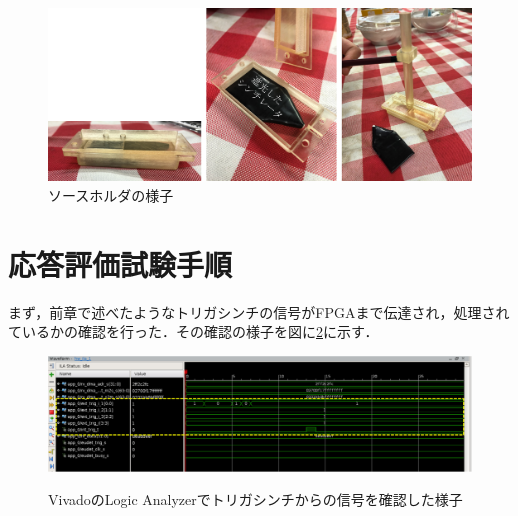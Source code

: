 \begin{figure}[h]
  \centering
  \includegraphics[width=15cm]{./figure/sourceholder.png}
  \caption{ソースホルダの様子}
  \label{fig:sourceholder}
\end{figure}

\section{応答評価試験手順}
\label{sec:exthow}
まず，前章で述べたようなトリガシンチの信号がFPGAまで伝達され，処理されているかの確認を行った．その確認の様子を図に\ref{fig:extwf}に示す．
\begin{figure}[h]
  \centering
  \includegraphics[width=17cm]{./figure/extWF.png}
  \label{fig:extwf}
  \caption{VivadoのLogic Analyzerでトリガシンチからの信号を確認した様子}
\end{figure}

